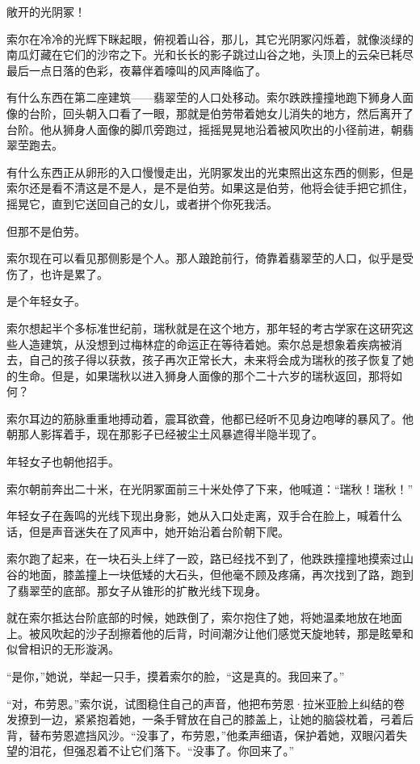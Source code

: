 \documentclass[AutoFakeBold=true]{book}
\begin{document}
{\kaishu 敞开的光阴冢！}

索尔在冷冷的光辉下眯起眼，俯视着山谷，那儿，其它光阴冢闪烁着，就像淡绿的南瓜灯藏在它们的沙帘之下。光和长长的影子跳过山谷之地，头顶上的云朵已耗尽最后一点日落的色彩，夜幕伴着嚎叫的风声降临了。

有什么东西在第二座建筑——翡翠茔的人口处移动。索尔跌跌撞撞地跑下狮身人面像的台阶，回头朝入口看了一眼，那就是伯劳带着她女儿消失的地方，然后离开了台阶。他从狮身人面像的脚爪旁跑过，摇摇晃晃地沿着被风吹出的小径前进，朝翡翠茔跑去。

有什么东西正从卵形的入口慢慢走出，光阴冢发出的光束照出这东西的侧影，但是索尔还是看不清这是不是人，是不是伯劳。如果这是伯劳，他将会徒手把它抓住，摇晃它，直到它送回自己的女儿，或者拼个你死我活。

但那不是伯劳。

索尔现在可以看见那侧影是个人。那人踉跄前行，倚靠着翡翠茔的人口，似乎是受伤了，也许是累了。

是个年轻女子。

索尔想起半个多标准世纪前，瑞秋就是在这个地方，那年轻的考古学家在这研究这些人造建筑，从没想到过梅林症的命运正在等待着她。索尔总是想象着疾病被消去，自己的孩子得以获救，孩子再次正常长大，未来将会成为瑞秋的孩子恢复了她的生命。但是，如果瑞秋以进入狮身人面像的那个二十六岁的瑞秋返回，那将如何？

索尔耳边的筋脉重重地搏动着，震耳欲聋，他都已经听不见身边咆哮的暴风了。他朝那人影挥着手，现在那影子已经被尘土风暴遮得半隐半现了。

年轻女子也朝他招手。

索尔朝前奔出二十米，在光阴冢面前三十米处停了下来，他喊道：``瑞秋！瑞秋！''

年轻女子在轰鸣的光线下现出身影，她从入口处走离，双手合在脸上，喊着什么话，但是声音迷失在了风声中，她开始沿着台阶朝下爬。

索尔跑了起来，在一块石头上绊了一跤，路已经找不到了，他跌跌撞撞地摸索过山谷的地面，膝盖撞上一块低矮的大石头，但他毫不顾及疼痛，再次找到了路，跑到了翡翠茔的底部。那女子从锥形的扩散光线下现身。

就在索尔抵达台阶底部的时候，她跌倒了，索尔抱住了她，将她温柔地放在地面上。被风吹起的沙子刮擦着他的后背，时间潮汐让他们感觉天旋地转，那是眩晕和似曾相识的无形漩涡。

``是你，''她说，举起一只手，摸着索尔的脸，``这是真的。我回来了。''

``对，布劳恩。''索尔说，试图稳住自己的声音，他把布劳恩·拉米亚脸上纠结的卷发撩到一边，紧紧抱着她，一条手臂放在自己的膝盖上，让她的脑袋枕着，弓着后背，替布劳恩遮挡风沙。``没事了，布劳恩，''他柔声细语，保护着她，双眼闪着失望的泪花，但强忍着不让它们落下。``没事了。你回来了。''
\end{document}
